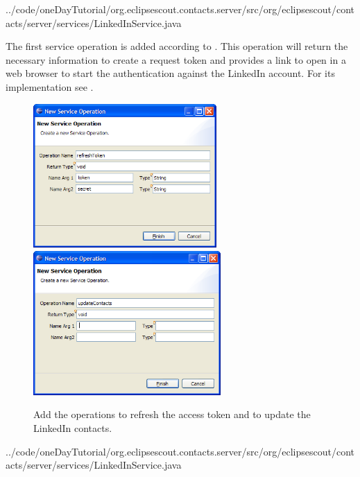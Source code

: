 \documentclass[a4paper,10pt,twoside]{book}
\begin{document}

{../code/oneDayTutorial/org.eclipsescout.contacts.server/src/org/eclipsescout/contacts/server/services/LinkedInService.java}

The first service operation  is added according to . 
This operation will return the necessary information to create a request token and provides a link to open in a web browser to start the authentication against the LinkedIn account. 
For its implementation see .

\begin{figure}
\includegraphics[height=5.5cm]{new_operation_refreshtoken.png} \hspace{5mm}
\includegraphics[height=5.5cm]{new_operation_updatecontacts.png}
\caption{Add the operations to refresh the access token and to update the LinkedIn contacts.}
\end{figure}


{../code/oneDayTutorial/org.eclipsescout.contacts.server/src/org/eclipsescout/contacts/server/services/LinkedInService.java}
\end{document}
